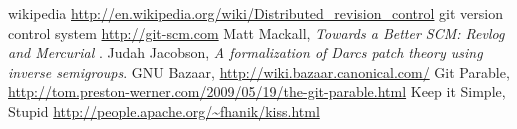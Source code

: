 \documentclass[12pt]{article}
\begin{document}
\begin{thebibliography}{99}
wikipedia \url{http://en.wikipedia.org/wiki/Distributed_revision_control}
git version control system \url{http://git-scm.com}
Matt Mackall, \emph{Towards a Better SCM: Revlog and Mercurial} .
Judah Jacobson, \emph{A formalization of Darcs patch theory using inverse
  semigroups}.
GNU Bazaar, \url{http://wiki.bazaar.canonical.com/}
Git Parable,
\url{http://tom.preston-werner.com/2009/05/19/the-git-parable.html}
Keep it Simple, Stupid
\url{http://people.apache.org/~fhanik/kiss.html}
\end{thebibliography}
\end{document}
